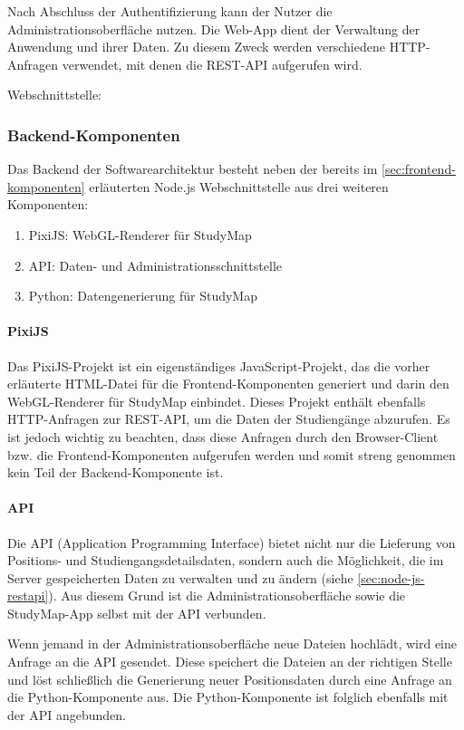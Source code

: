Nach Abschluss der Authentifizierung kann der Nutzer die Administrationsoberfläche nutzen. Die Web-App dient der Verwaltung der Anwendung und ihrer Daten. Zu diesem Zweck werden verschiedene HTTP-Anfragen verwendet, mit denen die REST-API aufgerufen wird.

\noindent
Webschnittstelle: 

\subsubsection{Backend-Komponenten}
Das Backend der Softwarearchitektur besteht neben der bereits im \autoref{sec:frontend-komponenten} erläuterten Node.js Webschnittstelle aus drei weiteren Komponenten: \begin{enumerate}
    \item PixiJS: WebGL-Renderer für StudyMap
    \item API: Daten- und Administrationsschnittstelle
    \item Python: Datengenerierung für StudyMap
\end{enumerate}

\paragraph*{PixiJS}
Das PixiJS-Projekt ist ein eigenständiges JavaScript-Projekt, das die vorher erläuterte HTML-Datei  für die Frontend-Komponenten generiert und darin den WebGL-Renderer für StudyMap einbindet. Dieses Projekt enthält ebenfalls HTTP-Anfragen zur REST-API, um die Daten der Studiengänge abzurufen. Es ist jedoch wichtig zu beachten, dass diese Anfragen durch den Browser-Client bzw. die Frontend-Komponenten aufgerufen werden und somit streng genommen kein Teil der Backend-Komponente ist.

\paragraph*{API}
Die API (Application Programming Interface) bietet nicht nur die Lieferung von Positions- und Studiengangsdetailsdaten, sondern auch die Möglichkeit, die im Server gespeicherten Daten zu verwalten und zu ändern (siehe \autoref{sec:node-js-restapi}). Aus diesem Grund ist die Administrationsoberfläche sowie die StudyMap-App selbst mit der API verbunden.

Wenn jemand in der Administrationsoberfläche neue Dateien hochlädt, wird eine Anfrage an die API gesendet. Diese speichert die Dateien an der richtigen Stelle und löst schließlich die Generierung neuer Positionsdaten durch eine Anfrage an die Python-Komponente aus. Die Python-Komponente ist folglich ebenfalls mit der API angebunden.

